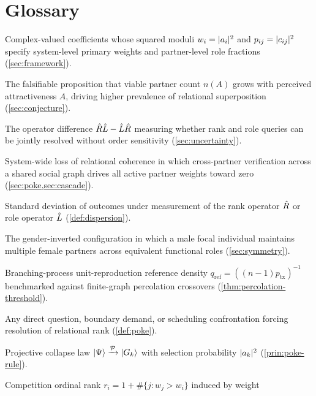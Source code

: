 \section{Glossary}
\label{app:glossary}

\begin{description}[leftmargin=1.8em,style=nextline]
  \item[Amplitudes ($a_i, c_{ij}$)] Complex-valued coefficients whose squared moduli
        $w_i = \lvert a_i \rvert^2$ and $p_{ij} = \lvert c_{ij} \rvert^2$ specify system-level
        primary weights and partner-level role fractions (\cref{sec:framework}).
  \item[Attractiveness-Optionality Conjecture] The falsifiable proposition that
        viable partner count $n(A)$ grows with perceived attractiveness $A$,
        driving higher prevalence of relational superposition (\cref{sec:conjecture}).
  \item[Commutator ($\comm{\opR}{\opL}$)] The operator difference $\hat{R}\hat{L} - \hat{L}\hat{R}$
        measuring whether rank and role queries can be jointly resolved without
        order sensitivity (\cref{sec:uncertainty}).
  \item[Decoherence] System-wide loss of relational coherence in which cross-partner
        verification across a shared social graph drives all active partner weights
        toward zero (\cref{sec:poke,sec:cascade}).
  \item[Dispersion ($\Delta R, \Delta L$)] Standard deviation of outcomes under
        measurement of the rank operator $\hat{R}$ or role operator $\hat{L}$
        (\cref{def:dispersion}).
  \item[Mirror configuration] The gender-inverted configuration in which a male
        focal individual maintains multiple female partners across equivalent
        functional roles (\cref{sec:symmetry}).
  \item[Percolation threshold ($q_{\mathrm{ref}}$)] Branching-process unit-reproduction
        reference density $q_{\mathrm{ref}} = ((n-1)p_{\mathrm{tx}})^{-1}$ benchmarked
        against finite-graph percolation crossovers (\cref{thm:percolation-threshold}).
  \item[Poke ($\poke$)] Any direct question, boundary demand, or scheduling
        confrontation forcing resolution of relational rank (\cref{def:poke}).
  \item[Poke Rule] Projective collapse law $\lvert \Psi \rangle \xrightarrow{\mathcal{P}} \lvert G_k \rangle$
        with selection probability $\lvert a_k \rvert^2$ (\cref{prin:poke-rule}).
  \item[Rank] Competition ordinal rank $r_i = 1 + \#\{j : w_j > w_i\}$ induced by weight

\end{description}
